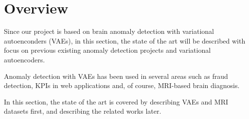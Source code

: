 \section*{Overview}

Since our project is based on brain anomaly detection with variational autoenconders (VAEs), in this section, the state of the art will be described with focus on previous existing anomaly detection projects and variational autoencoders.

Anomaly detection with VAEs has been used in several areas such as fraud detection, KPIs in web applications and, of course, MRI-based brain diagnosis.

In this section, the state of the art is covered by describing VAEs and MRI datasets first, and describing the related works later.